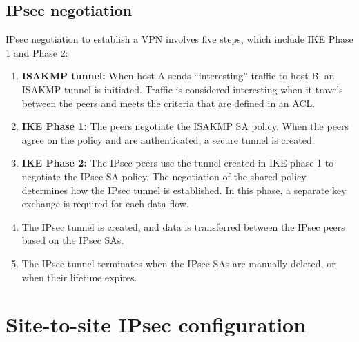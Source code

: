 


\subsection{IPsec negotiation}
IPsec negotiation to establish a VPN involves five steps, which include IKE Phase 1 and Phase 2:

\begin{enumerate}
\item \textbf{ISAKMP tunnel:}  When host A sends ``interesting'' traffic to host B, an ISAKMP tunnel is initiated. Traffic is considered interesting when it travels between the peers and meets the criteria that are defined in an ACL.

\item \textbf{IKE Phase 1:} The peers negotiate the ISAKMP SA policy. When the peers agree on the policy and are authenticated, a secure tunnel is created.

\item \textbf{IKE Phase 2:} The IPsec peers use the tunnel created in IKE phase 1 to negotiate the IPsec SA policy. The negotiation of the shared policy determines how the IPsec tunnel is established. In this phase, a separate key exchange is required for each data flow.

\item The IPsec tunnel is created, and data is transferred between the IPsec peers based on the IPsec SAs.

\item The IPsec tunnel terminates when the IPsec SAs are manually deleted, or when their lifetime expires.
\end{enumerate}

\section{Site-to-site IPsec configuration}


